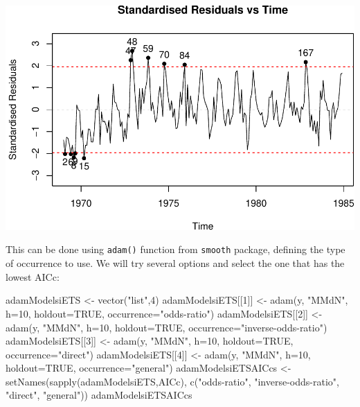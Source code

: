 \documentclass[
]{book}
\newenvironment{Shaded}{\begin{snugshade}}{\end{snugshade}}
\newcommand{\AttributeTok}[1]{\textcolor[rgb]{0.77,0.63,0.00}{#1}}
\newcommand{\ConstantTok}[1]{\textcolor[rgb]{0.00,0.00,0.00}{#1}}
\newcommand{\DecValTok}[1]{\textcolor[rgb]{0.00,0.00,0.81}{#1}}
\newcommand{\FunctionTok}[1]{\textcolor[rgb]{0.00,0.00,0.00}{#1}}
\newcommand{\NormalTok}[1]{#1}
\newcommand{\OtherTok}[1]{\textcolor[rgb]{0.56,0.35,0.01}{#1}}
\newcommand{\StringTok}[1]{\textcolor[rgb]{0.31,0.60,0.02}{#1}}
\theoremstyle{definition}
\theoremstyle{definition}
\theoremstyle{definition}
\theoremstyle{definition}
\theoremstyle{remark}
\begin{document}
\includegraphics{adam_files/figure-latex/unnamed-chunk-115-1.pdf}

This can be done using \texttt{adam()} function from \texttt{smooth} package, defining the type of occurrence to use. We will try several options and select the one that has the lowest AICc:

\begin{Shaded}
\begin{Highlighting}[]
\NormalTok{adamModelsiETS }\OtherTok{\textless{}{-}} \FunctionTok{vector}\NormalTok{(}\StringTok{"list"}\NormalTok{,}\DecValTok{4}\NormalTok{)}
\NormalTok{adamModelsiETS[[}\DecValTok{1}\NormalTok{]] }\OtherTok{\textless{}{-}} \FunctionTok{adam}\NormalTok{(y, }\StringTok{"MMdN"}\NormalTok{, }\AttributeTok{h=}\DecValTok{10}\NormalTok{, }\AttributeTok{holdout=}\ConstantTok{TRUE}\NormalTok{,}
                            \AttributeTok{occurrence=}\StringTok{"odds{-}ratio"}\NormalTok{)}
\NormalTok{adamModelsiETS[[}\DecValTok{2}\NormalTok{]] }\OtherTok{\textless{}{-}} \FunctionTok{adam}\NormalTok{(y, }\StringTok{"MMdN"}\NormalTok{, }\AttributeTok{h=}\DecValTok{10}\NormalTok{, }\AttributeTok{holdout=}\ConstantTok{TRUE}\NormalTok{,}
                            \AttributeTok{occurrence=}\StringTok{"inverse{-}odds{-}ratio"}\NormalTok{)}
\NormalTok{adamModelsiETS[[}\DecValTok{3}\NormalTok{]] }\OtherTok{\textless{}{-}} \FunctionTok{adam}\NormalTok{(y, }\StringTok{"MMdN"}\NormalTok{, }\AttributeTok{h=}\DecValTok{10}\NormalTok{, }\AttributeTok{holdout=}\ConstantTok{TRUE}\NormalTok{,}
                            \AttributeTok{occurrence=}\StringTok{"direct"}\NormalTok{)}
\NormalTok{adamModelsiETS[[}\DecValTok{4}\NormalTok{]] }\OtherTok{\textless{}{-}} \FunctionTok{adam}\NormalTok{(y, }\StringTok{"MMdN"}\NormalTok{, }\AttributeTok{h=}\DecValTok{10}\NormalTok{, }\AttributeTok{holdout=}\ConstantTok{TRUE}\NormalTok{,}
                            \AttributeTok{occurrence=}\StringTok{"general"}\NormalTok{)}
\NormalTok{adamModelsiETSAICcs }\OtherTok{\textless{}{-}}
    \FunctionTok{setNames}\NormalTok{(}\FunctionTok{sapply}\NormalTok{(adamModelsiETS,AICc),}
             \FunctionTok{c}\NormalTok{(}\StringTok{"odds{-}ratio"}\NormalTok{, }\StringTok{"inverse{-}odds{-}ratio"}\NormalTok{,}
               \StringTok{"direct"}\NormalTok{, }\StringTok{"general"}\NormalTok{))}
\NormalTok{adamModelsiETSAICcs}
\end{Highlighting}
\end{Shaded}
\end{document}

